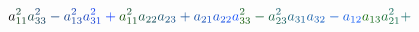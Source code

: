 \documentclass[12pt]{article}
\begin{document}
\begin{displaymath}
{a} _ { \mathcolor[RGB]{15,60,15}{1} \mathcolor[RGB]{15,60,30}{1} } ^ { \mathcolor[RGB]{15,60,45}{2} } \mathcolor[RGB]{15,60,60}{a} _ { \mathcolor[RGB]{15,60,75}{3} \mathcolor[RGB]{15,60,90}{3} } ^ { \mathcolor[RGB]{15,60,105}{2} } \mathcolor[RGB]{15,60,120}{-} \mathcolor[RGB]{15,60,135}{a} _ { \mathcolor[RGB]{15,60,150}{1} \mathcolor[RGB]{15,60,165}{3} } ^ { \mathcolor[RGB]{15,60,180}{2} } \mathcolor[RGB]{15,60,195}{a} _ { \mathcolor[RGB]{15,60,210}{3} \mathcolor[RGB]{15,60,225}{1} } ^ { \mathcolor[RGB]{15,60,240}{2} } \mathcolor[RGB]{15,60,255}{+} \mathcolor[RGB]{15,75,0}{a} _ { \mathcolor[RGB]{15,75,15}{1} \mathcolor[RGB]{15,75,30}{1} } ^ { \mathcolor[RGB]{15,75,45}{2} } \mathcolor[RGB]{15,75,60}{a} _ { \mathcolor[RGB]{15,75,75}{2} \mathcolor[RGB]{15,75,90}{2} } \mathcolor[RGB]{15,75,105}{a} _ { \mathcolor[RGB]{15,75,120}{2} \mathcolor[RGB]{15,75,135}{3} } \mathcolor[RGB]{15,75,150}{+} \mathcolor[RGB]{15,75,165}{a} _ { \mathcolor[RGB]{15,75,180}{2} \mathcolor[RGB]{15,75,195}{1} } \mathcolor[RGB]{15,75,210}{a} _ { \mathcolor[RGB]{15,75,225}{2} \mathcolor[RGB]{15,75,240}{2} } \mathcolor[RGB]{15,75,255}{a} _ { \mathcolor[RGB]{15,90,0}{3} \mathcolor[RGB]{15,90,15}{3} } ^ { \mathcolor[RGB]{15,90,30}{2} } \mathcolor[RGB]{15,90,45}{-} \mathcolor[RGB]{15,90,60}{a} _ { \mathcolor[RGB]{15,90,75}{2} \mathcolor[RGB]{15,90,90}{3} } ^ { \mathcolor[RGB]{15,90,105}{2} } \mathcolor[RGB]{15,90,120}{a} _ { \mathcolor[RGB]{15,90,135}{3} \mathcolor[RGB]{15,90,150}{1} } \mathcolor[RGB]{15,90,165}{a} _ { \mathcolor[RGB]{15,90,180}{3} \mathcolor[RGB]{15,90,195}{2} } \mathcolor[RGB]{15,90,210}{-} \mathcolor[RGB]{15,90,225}{a} _ { \mathcolor[RGB]{15,90,240}{1} \mathcolor[RGB]{15,90,255}{2} } \mathcolor[RGB]{15,105,0}{a} _ { \mathcolor[RGB]{15,105,15}{1} \mathcolor[RGB]{15,105,30}{3} } \mathcolor[RGB]{15,105,45}{a} _ { \mathcolor[RGB]{15,105,60}{2} \mathcolor[RGB]{15,105,75}{1} } ^ { \mathcolor[RGB]{15,105,90}{2} } \mathcolor[RGB]{15,105,105}{+} \mathcolor[RGB]{15,105,120}{\,
}
\end{displaymath}
\end{document}
